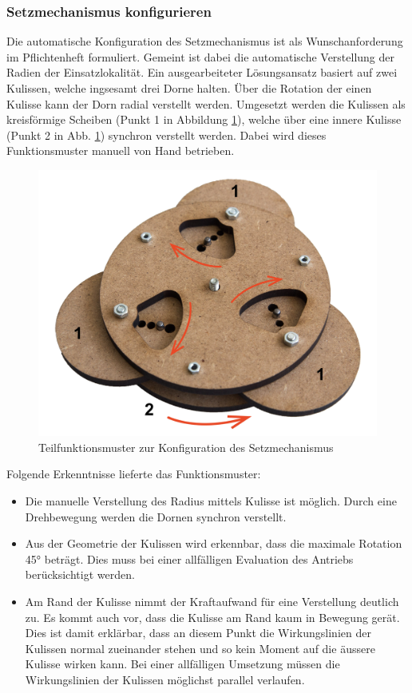 \subsubsection{Setzmechanismus konfigurieren}
Die automatische Konfiguration des Setzmechanismus ist als Wunschanforderung im Pflichtenheft formuliert. Gemeint ist dabei die automatische Verstellung der Radien der Einsatzlokalität. Ein ausgearbeiteter Lösungsansatz basiert auf zwei Kulissen, welche ingsesamt drei Dorne halten. Über die Rotation der einen Kulisse kann der Dorn radial verstellt werden. Umgesetzt werden die Kulissen als kreisförmige Scheiben (Punkt 1 in Abbildung \ref{fig:setzmech_konfig}), welche über eine innere Kulisse (Punkt 2 in Abb. \ref{fig:setzmech_konfig}) synchron verstellt werden. Dabei wird dieses Funktionsmuster manuell von Hand betrieben.
\begin{figure}[H]
	\includegraphics[width=1\textwidth]{Illustrationen/5-Konzept/setzmech_konfig_1.jpg}
	\caption{Teilfunktionsmuster zur Konfiguration des Setzmechanismus}
	\label{fig:setzmech_konfig}
\end{figure}
Folgende Erkenntnisse lieferte das Funktionsmuster:
\begin{itemize}
	\item Die manuelle Verstellung des Radius mittels Kulisse ist möglich. Durch eine Drehbewegung werden die Dornen synchron verstellt.
	
	\item Aus der Geometrie der Kulissen wird erkennbar, dass die maximale Rotation 45° beträgt. Dies muss bei einer allfälligen Evaluation des Antriebs berücksichtigt werden.
	
	\item Am Rand der Kulisse nimmt der Kraftaufwand für eine Verstellung deutlich zu. Es kommt auch vor, dass die Kulisse am Rand kaum in Bewegung gerät. Dies ist damit erklärbar, dass an diesem Punkt die Wirkungslinien der Kulissen normal zueinander stehen und so kein Moment auf die äussere Kulisse wirken kann. Bei einer allfälligen Umsetzung müssen die Wirkungslinien der Kulissen möglichst parallel verlaufen. 
\end{itemize} 
\newpage
